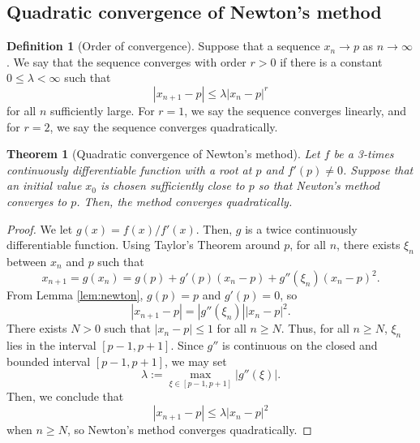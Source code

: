 \documentclass{article}
\theoremstyle{plain}
\newtheorem{theorem}[proposition]{Theorem}
\theoremstyle{definition}
\newtheorem{definition}[proposition]{Definition}
\begin{document}
\subsection{Quadratic convergence of Newton's method}

\begin{definition}[Order of convergence]
  Suppose that a sequence $x_n \to p$ as $n \to \infty$.
  We say that the sequence converges with order $r > 0$ if there is a constant $0 \leq \lambda < \infty$ such that
  \begin{equation}
    |x_{n+1} - p| \leq \lambda |x_n - p|^r
  \end{equation}
  for all $n$ sufficiently large.
  For $r = 1$, we say the sequence converges linearly, and for $r = 2$, we say the sequence converges quadratically.
\end{definition}

\begin{theorem}[Quadratic convergence of Newton's method]
  Let $f$ be a 3-times continuously differentiable function with a root at $p$ and $f'(p) \neq 0$.
  Suppose that an initial value $x_0$ is chosen sufficiently close to $p$ so that Newton's method converges to $p$.
  Then, the method converges quadratically.
\end{theorem}
\begin{proof}
  We let $g(x) = f(x)/f'(x)$.
  Then, $g$ is a twice continuously differentiable function.
  Using Taylor's Theorem around $p$, for all $n$, there exists $\xi_n$ between $x_n$ and $p$ such that
  \begin{equation*}
    x_{n+1} = g(x_n) = g(p) + g'(p)(x_n - p) + g''(\xi_n)(x_n - p)^2.
  \end{equation*}
  From Lemma \ref{lem:newton}, $g(p) = p$ and $g'(p) = 0$, so
  \begin{equation*}
    |x_{n+1} - p| = |g''(\xi_n)||x_n-p|^2.
  \end{equation*}
  There exists $N > 0$ such that $|x_n - p| \leq 1$ for all $n \geq N$.
  Thus, for all $n \geq N$, $\xi_n$ lies in the interval $[p-1, p+1]$.
  Since $g''$ is continuous on the closed and bounded interval $[p-1,p+1]$, we may set
  \begin{equation*}
    \lambda := \max_{\xi \in [p-1,p+1]}|g''(\xi)|.
  \end{equation*}
  Then, we conclude that
  \begin{equation*}
    |x_{n+1} - p| \leq \lambda |x_n-p|^2
  \end{equation*}
  when $n \geq N$, so Newton's method converges quadratically.
\end{proof}
\end{document}
